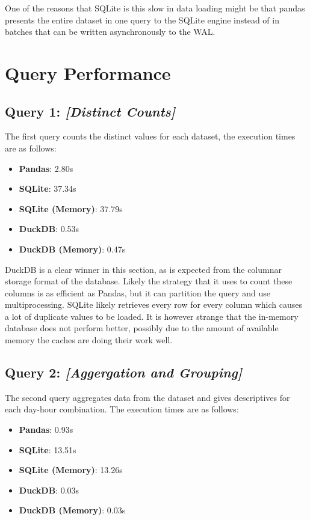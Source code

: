 \documentclass[a4paper,10pt]{article}
\begin{document}
One of the reasons that SQLite is this slow in data loading might be that pandas
presents the entire dataset in one query to the SQLite engine instead of in batches
that can be written asynchronously to the WAL.

\section{Query Performance}
\subsection{Query 1: \textit{[Distinct Counts]}}

The first query counts the distinct values for each dataset, the execution times
are as follows:

\begin{itemize}
  \item \textbf{Pandas}: 2.80s
  \item \textbf{SQLite}: 37.34s
  \item \textbf{SQLite (Memory)}: 37.79s
  \item \textbf{DuckDB}: 0.53s
  \item \textbf{DuckDB (Memory)}: 0.47s
\end{itemize}

DuckDB is a clear winner in this section, as is expected from the columnar storage
format of the database. Likely the strategy that it uses to count these columns is
as efficient as Pandas, but it can partition the query and use multiprocessing. SQLite
likely retrieves every row for every column which causes a lot of duplicate values to
be loaded. It is however strange that the in-memory database does not perform better,
possibly due to the amount of available memory the caches are doing their work well.

\subsection{Query 2: \textit{[Aggergation and Grouping]}}

The second query aggregates data from the dataset and gives descriptives for each
day-hour combination. The execution times are as follows:

\begin{itemize}
  \item \textbf{Pandas}: 0.93s
  \item \textbf{SQLite}: 13.51s
  \item \textbf{SQLite (Memory)}: 13.26s
  \item \textbf{DuckDB}: 0.03s
  \item \textbf{DuckDB (Memory)}: 0.03s
\end{itemize}
\end{document}
